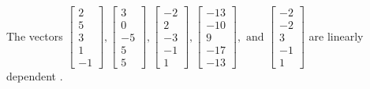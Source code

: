 \begin{exercise}
\begin{exerciseStatement}
  \end{exerciseStatement}
  \begin{exerciseAnswer}
   The vectors \(\left[\begin{array}{r}
2 \\
5 \\
3 \\
1 \\
-1
\end{array}\right] , \left[\begin{array}{r}
3 \\
0 \\
-5 \\
5 \\
5
\end{array}\right] , \left[\begin{array}{r}
-2 \\
2 \\
-3 \\
-1 \\
1
\end{array}\right] , \left[\begin{array}{r}
-13 \\
-10 \\
9 \\
-17 \\
-13
\end{array}\right] , \text{ and } \left[\begin{array}{r}
-2 \\
-2 \\
3 \\
-1 \\
1
\end{array}\right]\) are 
  	 linearly dependent  .
  


  \end{exerciseAnswer}
\end{exercise}